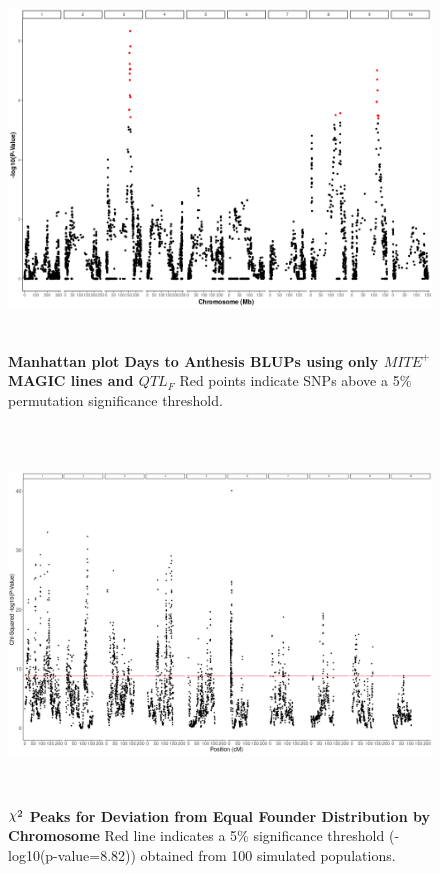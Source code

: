\documentclass[9pt,twocolumn,twoside]{gsag3jnl}
\DeclareRobustCommand{\rchi}{{\mathpalette\irchi\relax}}
\newcommand{\irchi}[2]{\raisebox{\depth}{$#1\chi$}} %
\begin{document}
\begin{figure}[ht]
\centering
\includegraphics[width=16cm,height=10cm]{figures/MITE_only_DTA_manhattan.png}
\caption{\textbf{Manhattan plot Days to Anthesis BLUPs using only $MITE^+$ MAGIC lines and $QTL_F$} Red points indicate SNPs above a  5\% permutation significance threshold.}
\label{fig:supfigure13}
\end{figure}

\begin{figure}[ht]
\centering
\includegraphics[width=16cm,height=10cm]{figures/all_chrom_founder_chi_sq.png}
\caption{\textbf{$\rchi^2$ Peaks for Deviation from Equal Founder Distribution by Chromosome} Red line indicates a 5\% significance threshold (-log10(p-value=8.82)) obtained from 100 simulated populations.}
\label{fig:supfigure11}
\end{figure}
\end{document}
